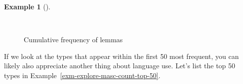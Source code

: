 \documentclass[
  letterpaper,
  krantz1]{latex/krantz-mod}
\theoremstyle{definition}
\newtheorem{example}{Example}[chapter]
\theoremstyle{definition}
\theoremstyle{remark}
\begin{document}
\begin{example}[]\protect\hypertarget{exm-explore-masc-count-cumulative}{}\label{exm-explore-masc-count-cumulative}

~

\begin{figure}[!htb]


\caption{\label{fig-explore-masc-count-cumulative}Cumulative frequency
of lemmas}

\end{figure}%

\end{example}

If we look at the types that appear within the first 50 most frequent,
you can likely also appreciate another thing about language use. Let's
list the top 50 types in Example~\ref{exm-explore-masc-count-top-50}.
\end{document}
